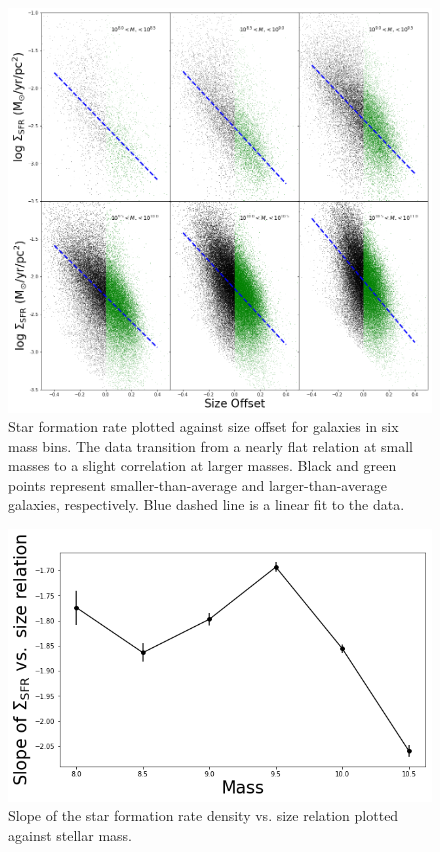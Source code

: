 \documentclass[iop]{emulateapj}
\begin{document}
\begin{figure}
	\centering
	\includegraphics[width=1.5 \columnwidth]{ha_lum_dens_2x2_2A.png}
	\caption{Star formation rate plotted against size offset for galaxies in six mass bins. The data transition from a nearly flat relation at small masses to a slight correlation at larger masses. Black and green points represent smaller-than-average and larger-than-average galaxies, respectively. Blue dashed line is a linear fit to the data.}
	\label{fig:sfrdens}
	
\end{figure}

\begin{figure}
	\centering
	\includegraphics[width= \columnwidth]{slope_sfrdens_size.png}
	\caption{Slope of the star formation rate density vs. size relation plotted against stellar mass.}
	\label{fig:HA_dens_mass}
	
\end{figure}
\end{document}
